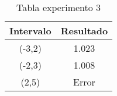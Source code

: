 \begin{table}[!h]
\begin{center}
\begin{tabular}{|c|c|}\hline
{\bf Intervalo} & {\bf Resultado}\\ \hline
(-3,2) & 1.023\\
(-2,3) & 1.008\\
(2,5) & Error\\%
\hline
\end{tabular}
\end{center}
\caption{Tabla experimento 3}
\label{Mitabla3}
\end{table}